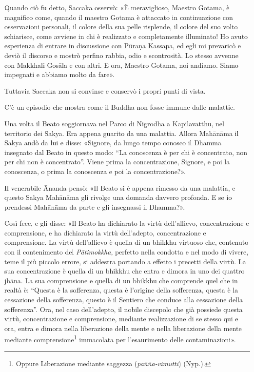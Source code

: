 Quando ciò fu detto, Saccaka osservò: «È meraviglioso, Maestro Gotama, è
magnifico come, quando il maestro Gotama è attaccato in continuazione
con osservazioni personali, il colore della sua pelle risplende, il
colore del suo volto schiarisce, come avviene in chi è realizzato e
completamente illuminato! Ho avuto esperienza di entrare in discussione
con Pūraṇa Kassapa, ed egli mi prevaricò e deviò il discorso e mostrò
perfino rabbia, odio e scontrosità. Lo stesso avvenne con Makkhali
Gosāla e con altri. E ora, Maestro Gotama, noi andiamo. Siamo impegnati
e abbiamo molto da fare».




 Tuttavia Saccaka non si convinse e conservò i propri
punti di vista.


 C’è un episodio che mostra come il Buddha non fosse
immune dalle malattie.


 Una volta il Beato soggiornava nel Parco di Nigrodha a
Kapilavatthu, nel territorio dei Sakya. Era appena guarito da una
malattia. Allora Mahānāma il Sakya andò da lui e disse: «Signore, da
lungo tempo conosco il Dhamma insegnato dal Beato in questo modo: “La
conoscenza è per chi è concentrato, non per chi non è concentrato”.
Viene prima la concentrazione, Signore, e poi la conoscenza, o prima la
conoscenza e poi la concentrazione?».


Il venerabile Ānanda pensò: «Il Beato si è appena rimesso da una
malattia, e questo Sakya Mahānāma gli rivolge una domanda davvero
profonda. E se io prendessi Mahānāma da parte e gli insegnassi il
Dhamma?».


Così fece, e gli disse: «Il Beato ha dichiarato la virtù dell’allievo,
concentrazione e comprensione, e ha dichiarato la virtù dell’adepto,
concentrazione e comprensione. La virtù dell’allievo è quella di un
bhikkhu virtuoso che, contenuto con il contenimento del \emph{Pātimokkha},
perfetto nella condotta e nel modo di vivere, teme il più piccolo
errore, si addestra portando a effetto i precetti della virtù. La sua
concentrazione è quella di un bhikkhu che entra e dimora in uno dei
quattro jhāna. La sua comprensione e quella di un bhikkhu che comprende
quel che in realtà è: “Questa è la sofferenza, questa è l’origine della
sofferenza, questa è la cessazione della sofferenza, questo è il
Sentiero che conduce alla cessazione della sofferenza”. Ora, nel caso
dell’adepto, il nobile discepolo che già possiede questa virtù,
concentrazione e comprensione, mediante realizzazione di se stesso qui e
ora, entra e dimora nella liberazione della mente e nella liberazione
della mente mediante comprensione\footnote{Oppure Liberazione mediante saggezza (\emph{paññā-vimutti}) (Nyp.).} immacolata per
l’esaurimento delle contaminazioni».


